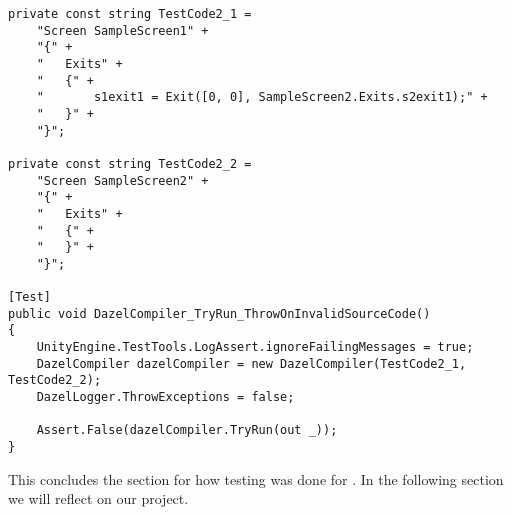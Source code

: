 \begin{lstlisting}[language=CSharp, caption={\dazel{} compiler integration test verifying that invalid source code results in an error}, label={lst:integrationTest2}, escapechar=|]
private const string TestCode2_1 =
    "Screen SampleScreen1" +
    "{" +
    "   Exits" +
    "   {" +
    "       s1exit1 = Exit([0, 0], SampleScreen2.Exits.s2exit1);" + 
    "   }" +
    "}";

private const string TestCode2_2 = 
    "Screen SampleScreen2" +
    "{" +
    "   Exits" +
    "   {" +
    "   }" +
    "}";

[Test]
public void DazelCompiler_TryRun_ThrowOnInvalidSourceCode()
{
    UnityEngine.TestTools.LogAssert.ignoreFailingMessages = true;
    DazelCompiler dazelCompiler = new DazelCompiler(TestCode2_1, TestCode2_2);
    DazelLogger.ThrowExceptions = false;
    
    Assert.False(dazelCompiler.TryRun(out _));
}
\end{lstlisting}

This concludes the section for how testing was done for \dazel{}. In the following section we will reflect on our project.